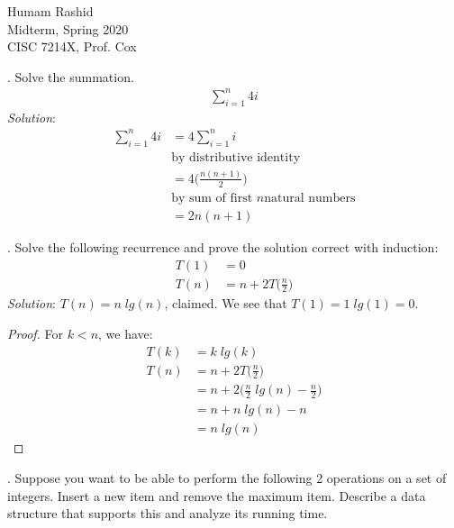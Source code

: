 \documentclass{scrartcl}
\begin{document}
\begin{flushleft}
    Humam Rashid\\
    Midterm, Spring 2020\\
    CISC 7214X, Prof. Cox
\end{flushleft}
    \bigskip
    
    . Solve the summation.
    \begin{align*}
        \sum_{i=1}^{n} 4i
    \end{align*}
    \textit{Solution}:
    \begin{align*}
        \sum_{i=1}^{n} 4i &= 4 \sum_{i=1}^{n} i\\[6pt]&\text{by distributive identity}\\[6pt]
                          &= 4 \bigg(\frac{n (n + 1)}{2}\bigg)\\[6pt]&\text{by sum of first $n$
                          natural numbers}\\[6pt]
                          &= 2n(n + 1)
    \end{align*}

    \bigskip
    . Solve the following recurrence and prove the solution correct with induction:
    \begin{align*}
        T(1) &= 0\\
        T(n) &= n + 2 T\bigg(\frac{n}{2}\bigg)
    \end{align*}
    \textit{Solution}: $T(n) = n\;lg(n)$, claimed. We see that $T(1) = 1\;lg(1) = 0$.\\
    \begin{proof}
        For $k < n$, we have:
        \begin{align*}
            T(k) &= k\;lg(k)\\
            T(n) &= n + 2 T\bigg(\frac{n}{2}\bigg)\\
                 &= n + 2 \bigg(\frac{n}{2}\;lg(n) - \frac{n}{2}\bigg)\\
                 &= n + n\;lg(n) - n\\
                 &= n\;lg(n)
        \end{align*}
    \end{proof}
    \newpage
    . Suppose you want to be able to perform the following 2 operations on a set of integers.
    Insert a new item and remove the maximum item. Describe a data structure that supports this and
    analyze its running time.\\
\end{document}
